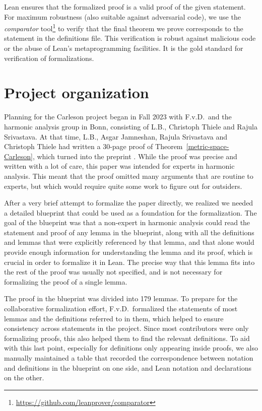 \documentclass[12pt, reqno]{amsart}
\theoremstyle{definition}
\theoremstyle{plain}
\begin{document}
Lean ensures that the formalized proof is a valid proof of the given statement.
For maximum robustness (also suitable against adversarial code), we use the \emph{comparator} tool\footnote{\url{https://github.com/leanprover/comparator}} to verify that the final theorem we prove corresponds to the statement in the definitions file.
This verification is robust against malicious code or the abuse of Lean's metaprogramming facilities. It is the gold standard for verification of formalizations.

\section{Project organization}\label{sec:org}

Planning for the Carleson project began in Fall 2023 with
F.v.D.\ and the harmonic analysis group in Bonn,
consisting of L.B., Christoph Thiele and Rajula Srivastava.
At that time, L.B., Asgar Jamneshan, Rajula Srivastava and Christoph Thiele had written a 30-page proof of Theorem~\ref{metric-space-Carleson}, which turned into the preprint \cite{ThieleCarlesonPreprint}.
While the proof was precise and written with a lot of care,
this paper was intended for experts in harmonic analysis.
This meant that the proof omitted many arguments that are routine to experts,
but which would require quite some work to figure out for outsiders.

After a very brief attempt to formalize the paper directly,
we realized we needed a detailed blueprint that could be used as a foundation for the formalization.
The goal of the blueprint was that a non-expert in harmonic analysis
could read the statement and proof of any lemma in the blueprint,
along with all the definitions and lemmas that were explicitly referenced by that lemma,
and that alone would provide enough information for understanding the lemma and its proof, which is crucial in order to formalize it in Lean.
The precise way that this lemma fits into the rest of the proof was usually not specified,
and is not necessary for formalizing the proof of a single lemma.

The proof in the blueprint was divided into 179 lemmas.
To prepare for the collaborative formalization effort,
F.v.D.\ formalized the statements of most lemmas and the definitions referred to in them, which helped to ensure consistency across statements in the project. Since most contributors were only formalizing proofs, this also helped them to find the relevant definitions. To aid with this last point, especially for definitions only appearing inside proofs, we also manually maintained a table
that recorded the correspondence between notation and definitions in the blueprint on one side,
and Lean notation and declarations on the other.
\end{document}
